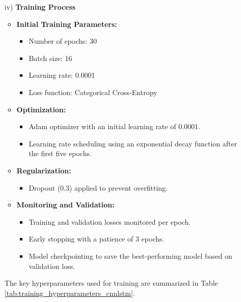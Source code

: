 \begin{itemize}
            \item[iv)] \textbf{Training Process} 
            \begin{itemize}
            \item \textbf{Initial Training Parameters:}
            \begin{itemize}
                  \item Number of epochs: 30
                  \item Batch size: 16
                  \item Learning rate: 0.0001
                  \item Loss function: Categorical Cross-Entropy
            \end{itemize}
            
            \item \textbf{Optimization:}
            \begin{itemize}
                  \item Adam optimizer with an initial learning rate of 0.0001.
                  \item Learning rate scheduling using an exponential decay function after the first five epochs.
            \end{itemize}
            
            \item \textbf{Regularization:}
            \begin{itemize}
                  \item Dropout (0.3) applied to prevent overfitting.
            \end{itemize}
            
            \item \textbf{Monitoring and Validation:}
            \begin{itemize}
                  \item Training and validation losses monitored per epoch.
                  \item Early stopping with a patience of 3 epochs.
                  \item Model checkpointing to save the best-performing model based on validation loss.
            \end{itemize}
            \end{itemize}
            \newpage
            The key hyperparameters used for training are summarized in Table \ref{tab:training_hyperparameters_cnnlstm}.


\end{itemize}
